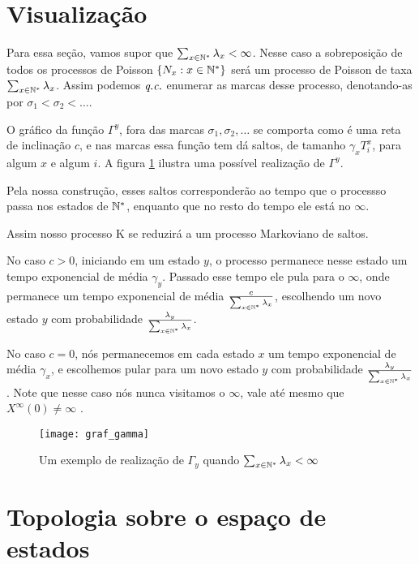 \section{Visualização}
\label{sec:visualizacao}

Para essa seção, vamos supor que $\sum_{x \in {\mathbb{N^*}}} \lambda_x <
\infty$. Nesse caso a sobreposição de todos os processos de Poisson
$\{N_x : x \in {\mathbb{N^*}}\}$ será um processo de Poisson de taxa $\sum_{x \in
  {\mathbb{N^*}}} \lambda_x$. Assim podemos ${\emph{q.c.}}$ enumerar as marcas desse
processo, denotando-as por $ \sigma_1 < \sigma_2 < \ldots$.

O gráfico da função $\Gamma^y$, fora das marcas $\sigma_1, \sigma_2,
\ldots$ se comporta como é uma reta de inclinação $c$, e nas marcas
essa função tem dá saltos, de tamanho $\gamma_x T^x_i$, para algum $x$
e algum $i$. A figura \ref{fig:graf_gamma} ilustra uma possível
realização de $\Gamma^y$.


Pela nossa construção, esses saltos corresponderão ao tempo que o
processso passa nos estados de ${\mathbb{N^*}}$, enquanto que no resto do tempo
ele está no $\infty$.

Assim nosso processo K se reduzirá a um processo Markoviano de
saltos.

No caso $c > 0$, iniciando em um estado $y$, o processo permanece
nesse estado um tempo exponencial de média $\gamma_y$. Passado esse
tempo ele pula para o $\infty$, onde permanece um tempo exponencial de
média $\frac{c}{\sum_{x \in {\mathbb{N^*}}} \lambda_x}$, escolhendo um novo
estado $y$ com probabilidade $\frac{\lambda_y}{\sum_{x \in {\mathbb{N^*}}}
  \lambda_x}$.

No caso $c=0$, nós permanecemos em cada estado $x$ um tempo
exponencial de média $\gamma_x$, e escolhemos pular para um novo estado $y$
com probabilidade $\frac{\lambda_y}{\sum_{x \in {\mathbb{N^*}}} \lambda_x}$.
Note que nesse caso nós nunca visitamos o $\infty$, vale até mesmo que
$X^\infty(0) \neq \infty$ \qc.


\begin{figure}
  \centering
  \texttt{[image: graf\_gamma]}
  \caption{Um exemplo de realização de $\Gamma_y$ quando $\sum_{x \in
      {\mathbb{N^*}}} \lambda_x < \infty$}
  \label{fig:graf_gamma}
\end{figure}

\section{Topologia sobre o espaço de estados}
\label{sec:topologia}

